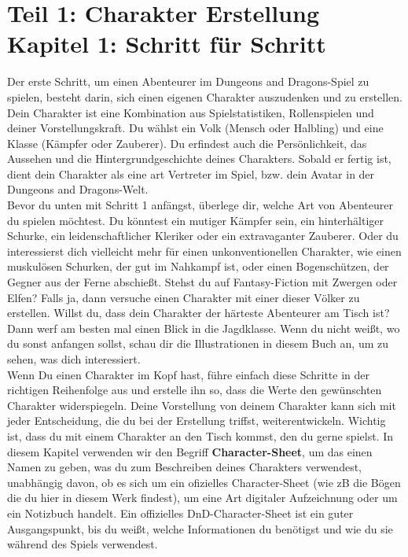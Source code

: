 \chapter[Kapitel 1: Schritt für Schritt]{Teil 1: Charakter Erstellung\\Kapitel 1: Schritt für Schritt}
Der erste Schritt, um einen Abenteurer im Dungeons and Dragons-Spiel zu spielen, besteht darin, sich einen eigenen Charakter auszudenken und zu erstellen. Dein Charakter ist eine Kombination aus Spielstatistiken, Rollenspielen und deiner Vorstellungskraft. Du wählst ein Volk (Mensch oder Halbling) und eine Klasse (Kämpfer oder Zauberer). Du erfindest auch die Persönlichkeit, das Aussehen und die Hintergrundgeschichte deines Charakters. Sobald er fertig ist, dient dein Charakter als eine art Vertreter im Spiel, bzw. dein Avatar in der Dungeons and Dragons-Welt.\\
Bevor du unten mit Schritt 1 anfängst, überlege dir, welche Art von Abenteurer du spielen möchtest. Du könntest ein mutiger Kämpfer sein, ein hinterhältiger Schurke, ein leidenschaftlicher Kleriker oder ein extravaganter Zauberer. Oder du interessierst dich vielleicht mehr für einen unkonventionellen Charakter, wie einen muskulösen Schurken, der gut im Nahkampf ist, oder einen Bogenschützen, der Gegner aus der Ferne abschießt. Stehst du auf Fantasy-Fiction mit Zwergen oder Elfen? Falls ja, dann versuche einen Charakter mit einer dieser Völker zu erstellen. Willst du, dass dein Charakter der härteste Abenteurer am Tisch ist? Dann werf am besten mal einen Blick in die Jagdklasse. Wenn du nicht weißt, wo du sonst anfangen sollst, schau dir die Illustrationen in diesem Buch an, um zu sehen, was dich interessiert.\\
Wenn Du einen Charakter im Kopf hast, führe einfach diese Schritte in der richtigen Reihenfolge aus und erstelle ihn so, dass die Werte den gewünschten Charakter widerspiegeln. Deine Vorstellung von deinem Charakter kann sich mit jeder Entscheidung, die du bei der Erstellung triffst, weiterentwickeln. Wichtig ist, dass du mit einem Charakter an den Tisch kommst, den du gerne spielst. In diesem Kapitel verwenden wir den Begriff \textbf{Character-Sheet}, um das einen Namen zu geben, was du zum Beschreiben deines Charakters verwendest, unabhängig davon, ob es sich um ein ofizielles Character-Sheet (wie zB die Bögen die du hier in diesem Werk findest), um eine Art digitaler Aufzeichnung oder um ein Notizbuch handelt. Ein offizielles DnD-Character-Sheet ist ein guter Ausgangspunkt, bis du weißt, welche Informationen du benötigst und wie du sie während des Spiels verwendest.
